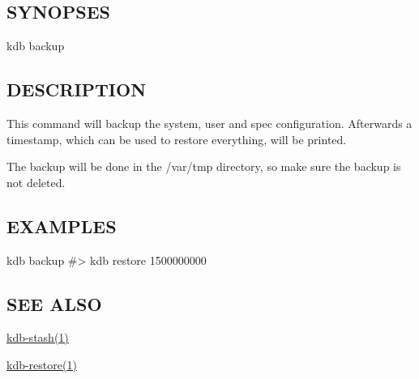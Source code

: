 \subsection*{S\+Y\+N\+O\+P\+S\+ES}

{\ttfamily kdb backup}

\subsection*{D\+E\+S\+C\+R\+I\+P\+T\+I\+ON}

This command will backup the {\ttfamily system}, {\ttfamily user} and {\ttfamily spec} configuration. Afterwards a timestamp, which can be used to restore everything, will be printed.

The backup will be done in the {\ttfamily /var/tmp} directory, so make sure the backup is not deleted.

\subsection*{E\+X\+A\+M\+P\+L\+ES}


\begin{DoxyCode}
kdb backup
#> kdb restore 1500000000
\end{DoxyCode}


\subsection*{S\+EE A\+L\+SO}


\begin{DoxyItemize}
\item \hyperlink{doc_help_kdb-stash_md}{kdb-\/stash(1)}
\item \hyperlink{doc_help_kdb-restore_md}{kdb-\/restore(1)} 
\end{DoxyItemize}